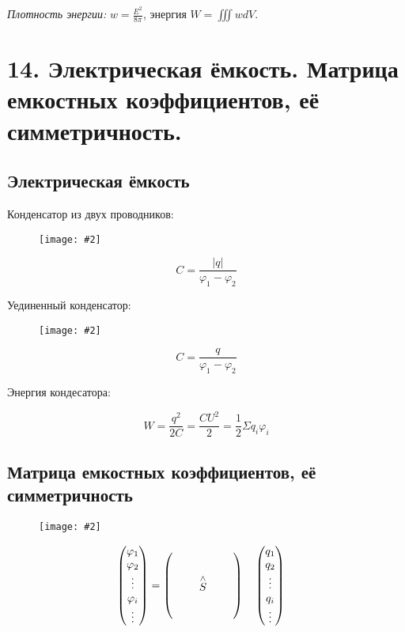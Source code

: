 \documentclass[a4paper,12pt]{article}
\newcommand{\kr}[1]{\textit{#1}}
\newcommand{\fc}[1]{\[#1\]}
\newcommand{\imc}[2][0.7\textwidth]{%
    \begin{figure}[h!]
        \centering
        \texttt{[image: \#2]}
    \end{figure}%
}
\begin{document}
\kr{Плотность энергии: }$w=\frac{E^2}{8\pi}$, энергия $W=\iiint wdV$.

\section*{14. Электрическая ёмкость. Матрица емкостных коэффициентов, её симметричность.}

\subsection*{Электрическая ёмкость}

Конденсатор из двух проводников:

\imc[0.4\textwidth]{27.png}

\fc{C=\frac{|q|}{\varphi_1-\varphi_2}}

Уединенный конденсатор:

\imc[0.2\textwidth]{28.png}

\fc{C=\frac{q}{\varphi_1-\varphi_2}}

Энергия кондесатора:

\fc{W=\frac{q^2}{2C}=\frac{CU^2}{2}=\frac{1}{2} \Sigma q_i\varphi_i  }

\newpage

\subsection*{Матрица емкостных коэффициентов, её симметричность}

\imc[0.4\textwidth]{26.png}

\fc{\begin{pmatrix}
\varphi_1 \\
\varphi_2 \\
\vdots \\
\varphi_i \\
\vdots
\end{pmatrix}
=
\renewcommand{\arraystretch}{1.8} %
\setlength{\arraycolsep}{1.2em}   %
\begin{pmatrix}
   &   &   \\
   & \overset{\wedge}{S} &   \\
   &   &  
\end{pmatrix}
\quad
\renewcommand{\arraystretch}{1.} 
\setlength{\arraycolsep}{1.2em}   
\begin{pmatrix}
q_1 \\
q_2 \\
\vdots \\
q_i \\
\vdots
\end{pmatrix}
\quad
}
\end{document}
